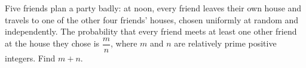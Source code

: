 Five friends plan a party badly: at noon, every friend leaves their own house and travels to one of the other four friends' houses, chosen uniformly at random and independently. The probability that every friend meets at least one other friend at the house they chose is $\dfrac mn$, where $m$ and $n$ are relatively prime positive integers. Find $m+n$.
